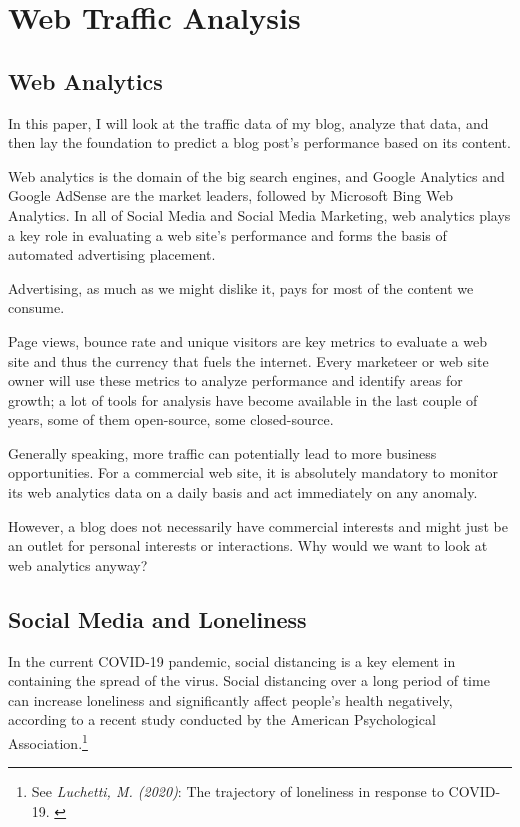 %
%

\pagebreak
\section{Web Traffic Analysis}

\onehalfspacing

\subsection{Web Analytics}

In this paper, I will look at the traffic data of my blog, analyze that data, and then lay the foundation to predict a blog post's performance based on its content.

Web analytics is the domain of the big search engines, and Google Analytics and Google AdSense are the market leaders, followed by Microsoft Bing Web Analytics. In all of Social Media and Social Media Marketing, web analytics plays a key role in evaluating a web site's performance and forms the basis of automated advertising placement.

Advertising, as much as we might dislike it, pays for most of the content we consume.

Page views, bounce rate and unique visitors are key metrics to evaluate a web site and thus the currency that fuels the internet. Every marketeer or web site owner will use these metrics to analyze performance and identify areas for growth; a lot of tools for analysis have become available in the last couple of years, some of them open-source, some closed-source.

Generally speaking, more traffic can potentially lead to more business opportunities. For a commercial web site, it is absolutely mandatory to monitor its web analytics data on a daily basis and act immediately on any anomaly.

However, a blog does not necessarily have commercial interests and might just be an outlet for personal interests or interactions. Why would we want to look at web analytics anyway?

\subsection{Social Media and Loneliness}

In the current COVID-19 pandemic, social distancing is a key element in containing the spread of the virus. Social distancing over a long period of time can increase loneliness and significantly affect people's health negatively, according to a recent study conducted by the American Psychological Association.\footnote{See \textit{Luchetti, M. (2020)}: The trajectory of loneliness in response to COVID-19. \cite{apaLoneliness}}

